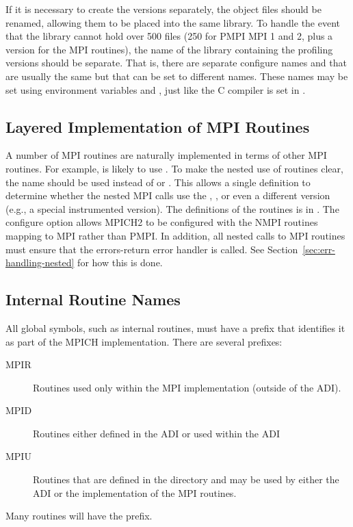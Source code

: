 \documentclass{article}
\begin{document}
If it is necessary to create the  versions separately, the
object files should be renamed, allowing them to be placed into the
same library.  To handle the event that the library cannot hold over
500 files (250 for PMPI MPI 1 and 2, plus a version for the MPI
routines), the name of the library containing the profiling versions
should be separate.  That is, there are separate configure names
 and  that are usually the same but that
can be set to different names.  These names may be set using environment
variables  and , just like the C compiler
is set in .


\subsection{Layered Implementation of MPI Routines}
\label{sec:layered}
A number of MPI routines are naturally implemented in terms of other
MPI routines.  For example,  is likely to use
.  To make the nested use of routines clear, the
name  should be used instead of  or
.  This allows a single definition to determine whether
the nested MPI calls use the , , or even a
different version (e.g., a special instrumented version).  The
definitions of the  routines is in
.  The configure option
 allows MPICH2 to be configured with
the NMPI routines mapping to MPI rather than PMPI.
In addition, all nested calls to MPI routines must ensure that the
errors-return error handler is called.  See
Section~\ref{sec:err-handling-nested} for how this is done.

\subsection{Internal Routine Names}
\label{sec:routine-names}
All global symbols, such as internal routines, must have a prefix that
identifies it as part of the MPICH implementation.  There are several
prefixes:
\begin{description}
\item[MPIR]Routines used only within the MPI implementation (outside of the
  ADI).
\item[MPID]Routines either defined in the ADI or used within the ADI
\item[MPIU]Routines that are defined in the  directory and
may be used by either the ADI or the implementation of the MPI
routines.
\end{description}
Many routines will have the  prefix.
\end{document}

